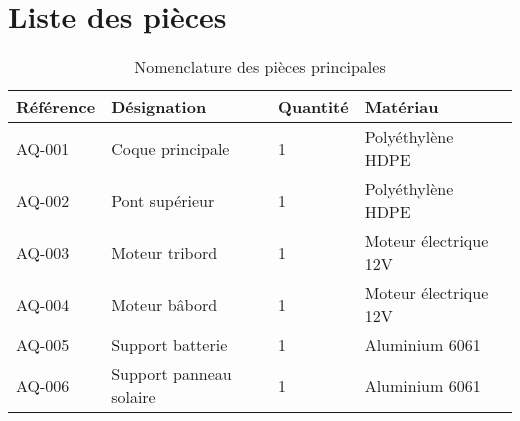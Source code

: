 \section{Liste des pièces}
\begin{table}[!htbp]
    \centering
    \caption{Nomenclature des pièces principales}
    \label{tab:parts-list}
    \begin{tabular}{llll}
        \toprule
        \textbf{Référence} & \textbf{Désignation} & \textbf{Quantité} & \textbf{Matériau} \\
        \midrule
        AQ-001 & Coque principale & 1 & Polyéthylène HDPE \\
        AQ-002 & Pont supérieur & 1 & Polyéthylène HDPE \\
        AQ-003 & Moteur tribord & 1 & Moteur électrique 12V \\
        AQ-004 & Moteur bâbord & 1 & Moteur électrique 12V \\
        AQ-005 & Support batterie & 1 & Aluminium 6061 \\
        AQ-006 & Support panneau solaire & 1 & Aluminium 6061 \\
        \bottomrule
    \end{tabular}
\end{table} 